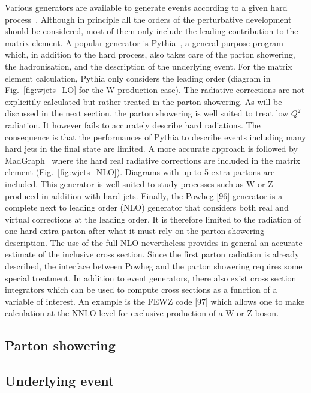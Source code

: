 Various generators are available to generate events according to a given hard process~\cite{Dobbs:2004qw}.
Although in principle all the orders of the perturbative development should be considered, most of them only include the leading contribution to the matrix element.
A popular generator is Pythia~\cite{Sjostrand:2007gs,Sjostrand:2006za}, a general purpose program which, in addition to the hard process, also takes care of the parton showering, the hadronisation, and the description of the underlying event.
For the matrix element calculation, Pythia only considers the leading order (diagram in Fig.~\ref{fig:wjets_LO} for the W production case).
The radiative corrections are not explicitily calculated but rather treated in the parton showering.
As will be discussed in the next section, the parton showering is well suited to treat low $Q^2$ radiation.
It however fails to accurately describe hard radiations. The consequence is that the performances of Pythia to describe events including many hard jets in the final state are limited.
A more accurate approach is followed by MadGraph~\cite{Alwall:2011uj} where the hard real radiative
corrections are included in the matrix element (Fig.~\ref{fig:wjets_NLO}). Diagrams with up to 5 extra partons are included. This generator is well suited to study processes such as W or Z produced in addition with hard jets.
Finally, the Powheg [96] generator is a complete next to leading order (NLO) generator that considers both real and virtual corrections at the leading order. It is therefore limited to the radiation of one hard extra parton after what it must rely on the parton showering description. The use of the full NLO nevertheless provides in general an accurate estimate of the inclusive cross section. Since the first parton radiation is already described, the interface between Powheg and the parton showering requires some special treatment.
In addition to event generators, there also exist cross section integrators which can be used to compute cross sections as a function of a variable of interest. An example is the FEWZ code [97] which allows one to make calculation at the NNLO level for exclusive production of a W or Z boson.

\subsection{Parton showering}

\subsection{Underlying event}

